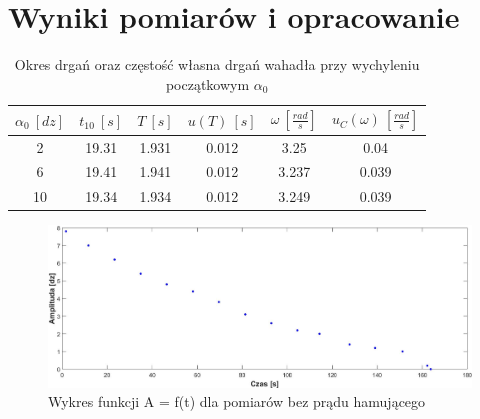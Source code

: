 \documentclass[12pt, a4paper, oneside]{article}
\begin{document}
\section{Wyniki pomiarów i opracowanie}
\begin{table}[h]
  \centering
  \caption{Okres drgań oraz częstość własna drgań wahadła przy wychyleniu początkowym $\alpha_0$}
    \begin{tabular}{|c|c|c|c|c|c|}\hline
    \multicolumn{1}{|c|}{$\alpha_0~[dz]$} & \multicolumn{1}{c|}{$t_{10}~[s]$} & \multicolumn{1}{c|}{$T~[s]$} & \multicolumn{1}{c|}{$u(T)~[s]$} & \multicolumn{1}{c|}{$\omega~[\frac{rad}{s}]$} & \multicolumn{1}{c|}{$u_C(\omega)~[\frac{rad}{s}]$} \\\hline
    2 & 19.31 & 1.931 & 0.012 & 3.25 & 0.04 \\\hline
    6 & 19.41 & 1.941 & 0.012 & 3.237 & 0.039 \\\hline
    10 & 19.34 & 1.934 & 0.012 & 3.249 & 0.039 \\\hline
    \end{tabular}%
\end{table}%
\clearpage
\begin{figure}[h]
\centering
\caption{Wykres funkcji A = f(t) dla pomiarów bez prądu hamującego}
\includegraphics[scale=0.3]{f1.png}
\end{figure}
\end{document}
